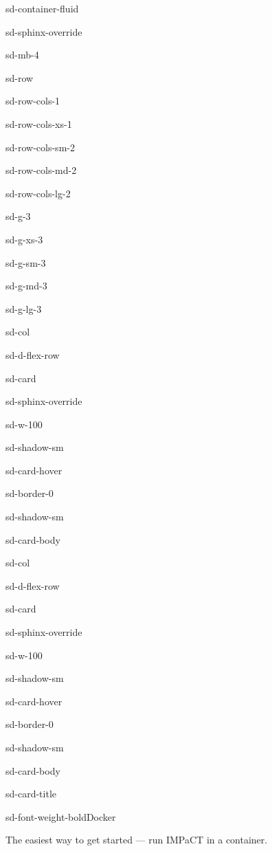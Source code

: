\documentclass[a4paper,10pt,english]{sphinxmanual}
\begin{document}
\begin{sphinxuseclass}{sd-container-fluid}
\begin{sphinxuseclass}{sd-sphinx-override}
\begin{sphinxuseclass}{sd-mb-4}
\begin{sphinxuseclass}{sd-row}
\begin{sphinxuseclass}{sd-row-cols-1}
\begin{sphinxuseclass}{sd-row-cols-xs-1}
\begin{sphinxuseclass}{sd-row-cols-sm-2}
\begin{sphinxuseclass}{sd-row-cols-md-2}
\begin{sphinxuseclass}{sd-row-cols-lg-2}
\begin{sphinxuseclass}{sd-g-3}
\begin{sphinxuseclass}{sd-g-xs-3}
\begin{sphinxuseclass}{sd-g-sm-3}
\begin{sphinxuseclass}{sd-g-md-3}
\begin{sphinxuseclass}{sd-g-lg-3}
\begin{sphinxuseclass}{sd-col}
\begin{sphinxuseclass}{sd-d-flex-row}
\begin{sphinxuseclass}{sd-card}
\begin{sphinxuseclass}{sd-sphinx-override}
\begin{sphinxuseclass}{sd-w-100}
\begin{sphinxuseclass}{sd-shadow-sm}
\begin{sphinxuseclass}{sd-card-hover}
\begin{sphinxuseclass}{sd-border-0}
\begin{sphinxuseclass}{sd-shadow-sm}
\begin{sphinxuseclass}{sd-card-body}
\end{sphinxuseclass}{\hyperref[\detokenize{getting-started/quickstart::doc}]{}}
\end{sphinxuseclass}
\end{sphinxuseclass}
\end{sphinxuseclass}
\end{sphinxuseclass}
\end{sphinxuseclass}
\end{sphinxuseclass}
\end{sphinxuseclass}
\end{sphinxuseclass}
\end{sphinxuseclass}
\begin{sphinxuseclass}{sd-col}
\begin{sphinxuseclass}{sd-d-flex-row}
\begin{sphinxuseclass}{sd-card}
\begin{sphinxuseclass}{sd-sphinx-override}
\begin{sphinxuseclass}{sd-w-100}
\begin{sphinxuseclass}{sd-shadow-sm}
\begin{sphinxuseclass}{sd-card-hover}
\begin{sphinxuseclass}{sd-border-0}
\begin{sphinxuseclass}{sd-shadow-sm}
\begin{sphinxuseclass}{sd-card-body}
\begin{sphinxuseclass}{sd-card-title}
\begin{sphinxuseclass}{sd-font-weight-bold}Docker
\end{sphinxuseclass}
\end{sphinxuseclass}
\sphinxAtStartPar
The easiest way to get started — run IMPaCT in a container.


\end{sphinxuseclass}
\end{sphinxuseclass}
\end{sphinxuseclass}
\end{sphinxuseclass}
\end{sphinxuseclass}
\end{sphinxuseclass}
\end{sphinxuseclass}
\end{sphinxuseclass}
\end{sphinxuseclass}
\end{sphinxuseclass}
\end{sphinxuseclass}
\end{sphinxuseclass}
\end{sphinxuseclass}
\end{sphinxuseclass}
\end{sphinxuseclass}
\end{sphinxuseclass}
\end{sphinxuseclass}
\end{sphinxuseclass}
\end{sphinxuseclass}
\end{sphinxuseclass}
\end{sphinxuseclass}
\end{sphinxuseclass}
\end{sphinxuseclass}
\end{sphinxuseclass}
\end{document}
